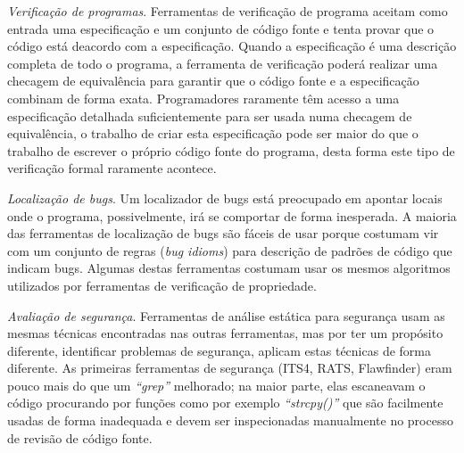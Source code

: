 \begin{description}
  \item \textit{Verificação de programas}.
    Ferramentas de verificação de programa aceitam como entrada uma especificação
    e um conjunto de código fonte e tenta provar que o código está deacordo
    com a especificação. Quando a especificação é uma descrição completa de
    todo o programa, a ferramenta de verificação poderá realizar uma checagem
    de equivalência para garantir que o código fonte e a especificação
    combinam de forma exata. Programadores raramente têm acesso a uma
    especificação detalhada suficientemente para ser usada numa checagem de
    equivalência, o trabalho de criar esta especificação pode ser maior do que
    o trabalho de escrever o próprio código fonte do programa, desta forma
    este tipo de verificação formal raramente acontece.

  \item \textit{Localização de bugs}. 
    Um localizador de bugs está
    preocupado em apontar locais onde o programa, possivelmente, irá se
    comportar de forma inesperada. A maioria das ferramentas de localização de
    bugs são fáceis de usar porque costumam vir com um conjunto de regras
    ({\it bug idioms}) para descrição de padrões de código que indicam bugs.
    Algumas destas ferramentas costumam usar os mesmos algoritmos utilizados
    por ferramentas de verificação de propriedade.

  \item \textit{Avaliação de segurança}. 
    Ferramentas de análise estática para segurança usam as mesmas técnicas
    encontradas nas outras ferramentas, mas por ter um propósito diferente,
    identificar problemas de segurança, aplicam estas técnicas de forma diferente.
    As primeiras ferramentas de segurança (ITS4, RATS, Flawfinder) eram pouco mais
    do que um {\it ``grep''} melhorado; na maior parte, elas escaneavam o código
    procurando por funções como por exemplo {\it ``strcpy()''} que são
    facilmente usadas de forma inadequada e devem ser inspecionadas
    manualmente no processo de revisão de código fonte.

\end{description}

